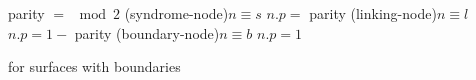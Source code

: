 \begin{algorithm}[htbp]
  \BlankLine
  parity $=$  $\bmod 2$\;
  \uIf(syndrome-node){$n \equiv s$}{
      $n.p =$ parity}
  \uElseIf(linking-node){$n \equiv l$}{
      $n.p= 1-$ parity}
  \ElseIf(boundary-node){$n \equiv b$}{
    $n.p= 1$}
  \caption{ for surfaces with boundaries}\label{algo:calcparitybound}
\end{algorithm}
